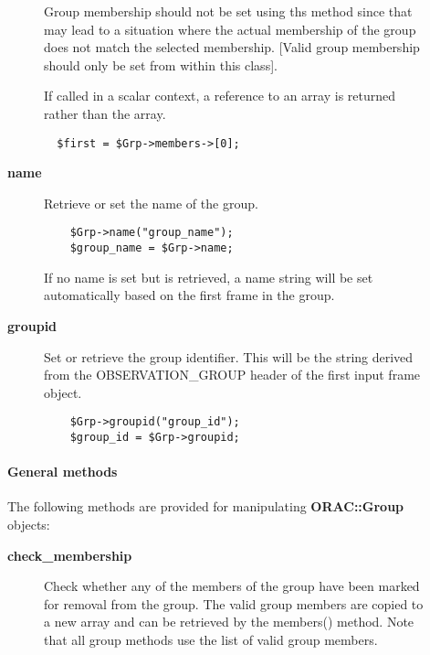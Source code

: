 \begin{description}
\begin{description}
Group membership should not be set using ths method since that may lead
to a situation where the actual membership of the group does not match the
selected membership. [Valid group membership should only be set from
within this class].



If called in a scalar context, a reference to an array is returned
rather than the array.

\begin{verbatim}
  $first = $Grp->members->[0];
\end{verbatim}

\item[{\textbf{name}}] \mbox{}

Retrieve or set the name of the group.

\begin{verbatim}
    $Grp->name("group_name");
    $group_name = $Grp->name;
\end{verbatim}


If no name is set but is retrieved, a name string will be
set automatically based on the first frame in the group.


\item[{\textbf{groupid}}] \mbox{}

Set or retrieve the group identifier. This will
be the string derived from the OBSERVATION\_GROUP
header of the first input frame object.

\begin{verbatim}
    $Grp->groupid("group_id");
    $group_id = $Grp->groupid;
\end{verbatim}
\end{description}
\paragraph*{General methods\label{ORAC::Group_General_methods}}


The following methods are provided for manipulating \textbf{ORAC::Group}
objects:

\begin{description}

\item[{\textbf{check\_membership}}] \mbox{}

Check whether any of the members of the group have been marked for
removal from the group. The valid group members are copied
to a new array and can be retrieved by the members() method.
Note that all group methods use the list of valid group
members.




\end{description}
\end{description}
